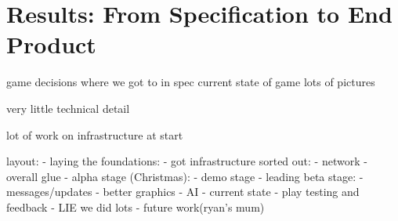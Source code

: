 \chapter{Results: From Specification to End Product}
\label{ch:game}











game decisions
where we got to in spec
current state of game
lots of pictures

very little technical detail

lot of work on infrastructure at start



layout:
- laying the foundations:
    - got infrastructure sorted out:
        - network
        - overall glue
- alpha stage (Christmas):
    - demo stage
- leading beta stage:
    - messages/updates
    - better graphics
    - AI
- current state
- play testing and feedback
    - LIE we did lots
- future work(ryan's mum)

     